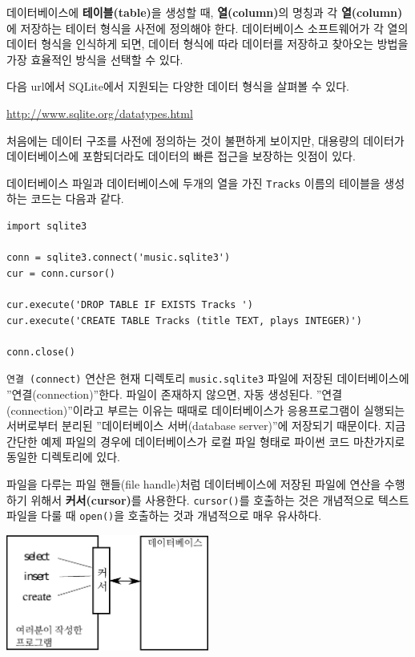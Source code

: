 데이터베이스에 {\bf 테이블(table)}을 생성할 때, {\bf 열(column)}의 명칭과 각 {\bf 열(column)}에 저장하는 테이터 형식을 사전에 정의해야 한다. 
데이터베이스 소프트웨어가 각 열의 데이터 형식을 인식하게 되면, 데이터 형식에 따라 데이터를 저장하고 찾아오는 방법을 가장 효율적인 방식을 선택할 수 있다.

다음 url에서 SQLite에서 지원되는 다양한 데이터 형식을 살펴볼 수 있다.

\url{http://www.sqlite.org/datatypes.html}

처음에는 데이터 구조를 사전에 정의하는 것이 불편하게 보이지만, 대용량의 데이터가 데이터베이스에 포함되더라도 데이터의 빠른 접근을 보장하는 잇점이 있다.

데이터베이스 파일과 데이터베이스에 두개의 열을 가진 {\tt Tracks} 이름의 테이블을 생성하는 코드는 다음과 같다.

\beforeverb
\begin{verbatim}
import sqlite3

conn = sqlite3.connect('music.sqlite3')
cur = conn.cursor()

cur.execute('DROP TABLE IF EXISTS Tracks ')
cur.execute('CREATE TABLE Tracks (title TEXT, plays INTEGER)')

conn.close()
\end{verbatim}
\afterverb
%


{\tt 연결 (connect)} 연산은 현재 디렉토리 {\tt music.sqlite3} 파일에 저장된 데이터베이스에 ''연결(connection)''한다.
파일이 존재하지 않으면, 자동 생성된다. 
''연결(connection)''이라고 부르는 이유는 때때로 데이터베이스가 응용프로그램이 실행되는 서버로부터
분리된 ''데이터베이스 서버(database server)''에 저장되기 때문이다.
지금 간단한 예제 파일의 경우에 데이터베이스가 로컬 파일 형태로 파이썬 코드 마찬가지로 동일한 디렉토리에 있다.

파일을 다루는 파일 핸들(file handle)처럼 데이터베이스에 저장된 파일에 연산을 수행하기 위해서 {\bf 커서(cursor)}를 사용한다.
{\tt cursor()}를 호출하는 것은 개념적으로 텍스트 파일을 다룰 때 {\tt open()}을 호출하는 것과 개념적으로 매우 유사하다.

\beforefig
\centerline{\includegraphics[height=1.50in]{figs2/cursor.eps}}
\afterfig

